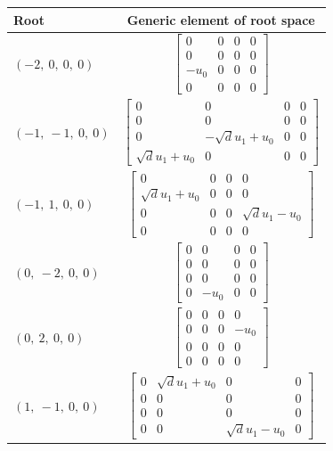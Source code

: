 \documentclass[11pt]{article}
\theoremstyle{definition}
\begin{document}
\bigskip

\noindent \begin{longtable}{|l|c|}
    \hline
    \textbf{Root} & \textbf{Generic element of root space} \\
    \hline
    \endhead
    $\left( -2, \  0, \  0, \  0\right)$ & ${\left[\begin{matrix}0 & 0 & 0 & 0\\0 & 0 & 0 & 0\\- u_{0} & 0 & 0 & 0\\0 & 0 & 0 & 0\end{matrix}\right]}$ \\
    \hline
    $\left( -1, \  -1, \  0, \  0\right)$ & ${\left[\begin{matrix}0 & 0 & 0 & 0\\0 & 0 & 0 & 0\\0 & - \sqrt{d} u_{1} + u_{0} & 0 & 0\\\sqrt{d} u_{1} + u_{0} & 0 & 0 & 0\end{matrix}\right]}$ \\
    \hline
    $\left( -1, \  1, \  0, \  0\right)$ & ${\left[\begin{matrix}0 & 0 & 0 & 0\\\sqrt{d} u_{1} + u_{0} & 0 & 0 & 0\\0 & 0 & 0 & \sqrt{d} u_{1} - u_{0}\\0 & 0 & 0 & 0\end{matrix}\right]}$ \\
    \hline
    $\left( 0, \  -2, \  0, \  0\right)$ & ${\left[\begin{matrix}0 & 0 & 0 & 0\\0 & 0 & 0 & 0\\0 & 0 & 0 & 0\\0 & - u_{0} & 0 & 0\end{matrix}\right]}$ \\
    \hline
    $\left( 0, \  2, \  0, \  0\right)$ & ${\left[\begin{matrix}0 & 0 & 0 & 0\\0 & 0 & 0 & - u_{0}\\0 & 0 & 0 & 0\\0 & 0 & 0 & 0\end{matrix}\right]}$ \\
    \hline
    $\left( 1, \  -1, \  0, \  0\right)$ & ${\left[\begin{matrix}0 & \sqrt{d} u_{1} + u_{0} & 0 & 0\\0 & 0 & 0 & 0\\0 & 0 & 0 & 0\\0 & 0 & \sqrt{d} u_{1} - u_{0} & 0\end{matrix}\right]}$ \\

\end{longtable}
\end{document}
